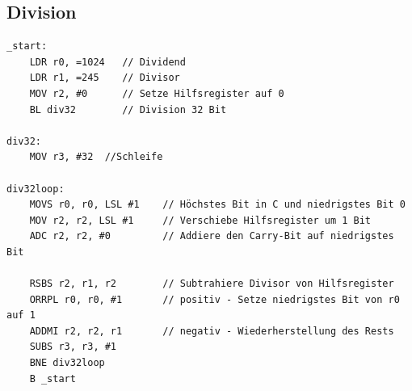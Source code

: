 \documentclass[a4paper, 11pt, onecolumn]{article}
\begin{document}
\subsection{Division}\label{app:benchdiv}
\begin{lstlisting}[basicstyle=\ttfamily\footnotesize, language={[ARM]Assembler}, caption={[Benchmark $-$ Divisions$-$Programm]}]
_start:
    LDR r0, =1024   // Dividend
    LDR r1, =245    // Divisor
    MOV r2, #0      // Setze Hilfsregister auf 0
    BL div32        // Division 32 Bit

div32:
    MOV r3, #32	 //Schleife

div32loop:
    MOVS r0, r0, LSL #1    // Höchstes Bit in C und niedrigstes Bit 0
    MOV r2, r2, LSL #1	   // Verschiebe Hilfsregister um 1 Bit
    ADC r2, r2, #0         // Addiere den Carry-Bit auf niedrigstes Bit

    RSBS r2, r1, r2        // Subtrahiere Divisor von Hilfsregister
    ORRPL r0, r0, #1	   // positiv - Setze niedrigstes Bit von r0 auf 1
    ADDMI r2, r2, r1	   // negativ - Wiederherstellung des Rests
    SUBS r3, r3, #1		
    BNE div32loop
    B _start
\end{lstlisting}
\end{document}
